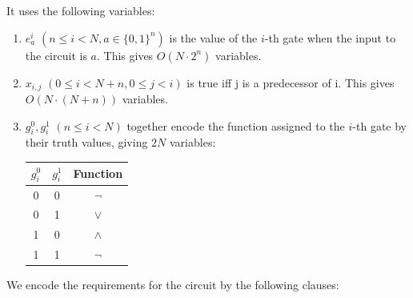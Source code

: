 \documentclass{article}
\begin{document}
It uses the following variables:

\begin{enumerate}
  \item \(e^i_a\) \((n \leq i < N, a\in\{0,1\}^n)\) is the value of the \(i\)-th gate when the input to the circuit is \(a\). This gives \(O(N \cdot 2^n)\) variables.
  \item \(x_{i,j}\) \(( 0 \leq i < N+n,0 \leq j < i)\) is true iff j is a predecessor of i. This gives \(O(N \cdot (N+n))\) variables.
  \item \(g^0_i, g^1_i\) \((n \leq i < N)\) together encode the function assigned to the \(i\)-th gate by their truth values, giving \(2N\) variables:

    \begin{center}
    \begin{tabular}{ |c|c|c| }
    \hline
    \(g^0_i\) & \(g^1_i\) & Function \\ 
    \hline
    0 & 0 & \(\neg\) \\  
    0 & 1 & \(\lor\) \\ 
    1 & 0 & \(\land\) \\ 
    1 & 1 & \(\neg\) \\   
    \hline
    \end{tabular}
    \end{center}

\end{enumerate}

We encode the requirements for the circuit by the following clauses:
\end{document}
